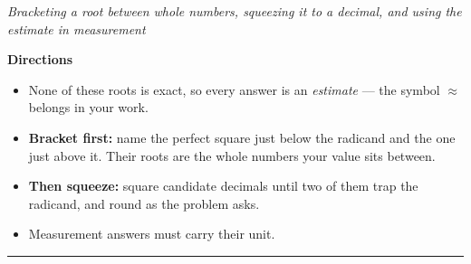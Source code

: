 \documentclass[12pt]{article}
\begin{document}

\begin{center}
\textit{Bracketing a root between whole numbers, squeezing it to a decimal, and using the
estimate in measurement}
\end{center}

\noindent\textbf{Directions}
\begin{itemize}[leftmargin=0.9cm, itemsep=1pt, topsep=2pt]
  \item None of these roots is exact, so every answer is an \emph{estimate} --- the
        symbol $\approx$ belongs in your work.
  \item \textbf{Bracket first:} name the perfect square just below the radicand and the
        one just above it. Their roots are the whole numbers your value sits between.
  \item \textbf{Then squeeze:} square candidate decimals until two of them trap the
        radicand, and round as the problem asks.
  \item Measurement answers must carry their unit.
\end{itemize}

\vspace{0.15cm}
\noindent\rule{\linewidth}{0.4pt}

\vspace{0.15cm}






\end{document}
